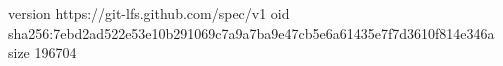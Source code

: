 version https://git-lfs.github.com/spec/v1
oid sha256:7ebd2ad522e53e10b291069c7a9a7ba9e47cb5e6a61435e7f7d3610f814e346a
size 196704
